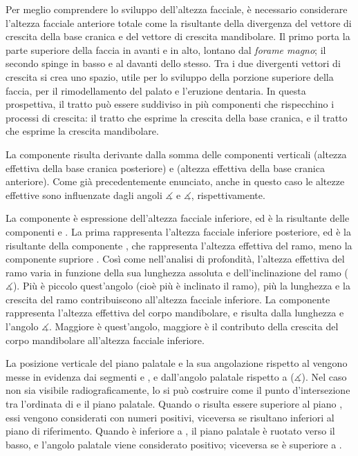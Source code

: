 Per meglio comprendere lo sviluppo dell'altezza facciale, è necessario considerare l'altezza facciale anteriore totale  come la risultante della divergenza del vettore di crescita della base cranica e del vettore di crescita mandibolare. Il primo porta la parte superiore della faccia in avanti e in alto, lontano dal \emph{forame magno}; il secondo spinge in basso e al davanti dello stesso. Tra i due divergenti vettori di crescita si crea uno spazio, utile per lo sviluppo della porzione superiore della faccia, per il rimodellamento del palato e l'eruzione dentaria. In questa prospettiva, il tratto  può essere suddiviso in più componenti che rispecchino i processi di crescita: il tratto  che esprime la crescita della base cranica, e il tratto  che esprime la crescita mandibolare.

La componente  risulta derivante dalla somma delle componenti verticali  (altezza effettiva della base cranica posteriore) e  (altezza effettiva della base cranica anteriore). Come già precedentemente enunciato, anche in questo caso le altezze effettive sono influenzate dagli angoli $\measuredangle$ e $\measuredangle$, rispettivamente.

La componente  è espressione dell'altezza facciale inferiore, ed è la risultante delle componenti  e . La prima rappresenta l'altezza facciale inferiore posteriore, ed è la risultante della componente , che rappresenta l'altezza effettiva del ramo, meno la componente supriore . Così come nell'analisi di profondità, l'altezza effettiva del ramo  varia in funzione della sua lunghezza assoluta e dell'inclinazione del ramo ($\measuredangle$). Più è piccolo quest'angolo (cioè più è inclinato il ramo), più la lunghezza e la crescita del ramo contribuiscono all'altezza facciale inferiore. La componente  rappresenta l'altezza effettiva del corpo mandibolare, e risulta dalla lunghezza  e l'angolo $\measuredangle$. Maggiore è quest'angolo, maggiore è il contributo della crescita del corpo mandibolare all'altezza facciale inferiore.

La posizione verticale del piano palatale e la sua angolazione rispetto al  vengono messe in evidenza dai segmenti  e , e dall'angolo palatale rispetto a  ($\measuredangle$). Nel caso  non sia visibile radiograficamente, lo si può costruire come il punto d'intersezione tra l'ordinata di  e il piano palatale. Quando  o  risulta essere superiore al piano , essi vengono considerati con numeri positivi, viceversa se risultano inferiori al piano di riferimento. Quando  è inferiore a , il piano palatale è ruotato verso il basso, e l'angolo palatale viene considerato positivo; viceversa se  è superiore a .

